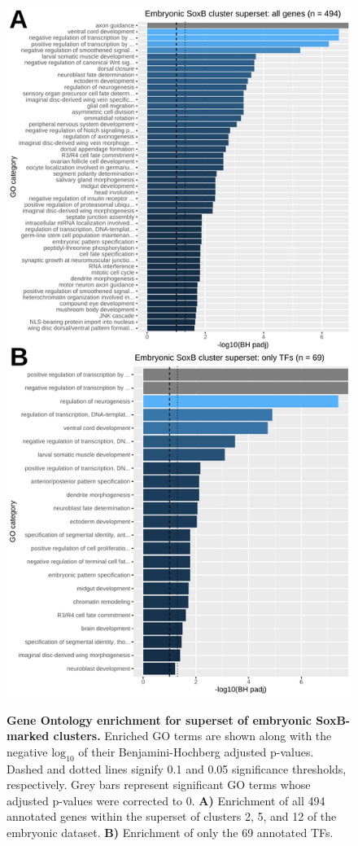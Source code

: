 \documentclass[withindex,glossary]{cam-thesis}
\begin{document}
\setcounter{figure}{9-1}
\begin{figure}[htbp]
\centering
\includegraphics[height=\dimexpr\textheight-97pt\relax,keepaspectratio]{figs/Fig9 zinzen superset TF and all.pdf}
\label{fig9}
\caption{\textbf{Gene Ontology enrichment for superset of embryonic SoxB-marked clusters.} Enriched GO terms are shown along with the negative $\text{log}_{10}$ of their Benjamini-Hochberg adjusted p-values. Dashed and dotted lines signify 0.1 and 0.05 significance thresholds, respectively. Grey bars represent significant GO terms whose adjusted p-values were corrected to 0. \textbf{A)} Enrichment of all 494 annotated genes within the superset of clusters 2, 5, and 12 of the embryonic dataset. \textbf{B)} Enrichment of only the 69 annotated TFs.}
\end{figure}
\end{document}
